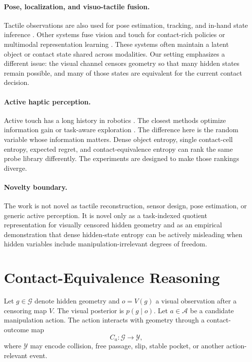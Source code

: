 \documentclass{article}
\newcommand{\Geom}{\mathcal{G}}
\newcommand{\Act}{\mathcal{A}}
\newcommand{\Outcome}{\mathcal{Y}}
\begin{document}
\paragraph{Pose, localization, and visuo-tactile fusion.}
Tactile observations are also used for pose estimation, tracking, and in-hand state inference \citep{bauza2023tac2pose,kissoum2021simultaneous,huang2024normalflow,lee2025vitascope}. Other systems fuse vision and touch for contact-rich policies or multimodal representation learning \citep{du2022play,zhan2026forceflow}. These systems often maintain a latent object or contact state shared across modalities. Our setting emphasizes a different issue: the visual channel censors geometry so that many hidden states remain possible, and many of those states are equivalent for the current contact decision.

\paragraph{Active haptic perception.}
Active touch has a long history in robotics \citep{seminara2019active}. The closest methods optimize information gain or task-aware exploration \citep{ottenhaus2018active,jiang2022active}. The difference here is the random variable whose information matters. Dense object entropy, single contact-cell entropy, expected regret, and contact-equivalence entropy can rank the same probe library differently. The experiments are designed to make those rankings diverge.

\paragraph{Novelty boundary.}
The work is not novel as tactile reconstruction, sensor design, pose estimation, or generic active perception. It is novel only as a task-indexed quotient representation for visually censored hidden geometry and as an empirical demonstration that dense hidden-state entropy can be actively misleading when hidden variables include manipulation-irrelevant degrees of freedom.

\section{Contact-Equivalence Reasoning}

Let $g\in\Geom$ denote hidden geometry and $o=V(g)$ a visual observation after a censoring map $V$. The visual posterior is $p(g\mid o)$. Let $a\in\Act$ be a candidate manipulation action. The action interacts with geometry through a contact-outcome map
\begin{equation}
    C_a:\Geom\rightarrow\Outcome,
\end{equation}
where $\Outcome$ may encode collision, free passage, slip, stable pocket, or another action-relevant event.
\end{document}
